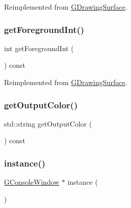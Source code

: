 Reimplemented from \mbox{\hyperlink{classGDrawingSurface_a4fa2d8b0192a3a5b4af4bbfe71194d03}{G\+Drawing\+Surface}}.

\mbox{\label{classGConsoleWindow_a88306467e229356d53f18913d7e167d1}} 
\subsubsection{\texorpdfstring{get\+Foreground\+Int()}{getForegroundInt()}}
{\footnotesize\ttfamily int get\+Foreground\+Int (\begin{DoxyParamCaption}{ }\end{DoxyParamCaption}) const\hspace{0.3cm}{\ttfamily [virtual]}}



Reimplemented from \mbox{\hyperlink{classGDrawingSurface_ac3b12ab385a6ef9ae90fc879860ba726}{G\+Drawing\+Surface}}.

\mbox{\label{classGConsoleWindow_a3da845f74a7bc662249a3d48435c876a}} 
\subsubsection{\texorpdfstring{get\+Output\+Color()}{getOutputColor()}}
{\footnotesize\ttfamily std\+::string get\+Output\+Color (\begin{DoxyParamCaption}{ }\end{DoxyParamCaption}) const\hspace{0.3cm}{\ttfamily [virtual]}}

\mbox{\label{classGConsoleWindow_ae0a74cd46dda62142582f3d8d512f4e5}} 
\subsubsection{\texorpdfstring{instance()}{instance()}}
{\footnotesize\ttfamily \mbox{\hyperlink{classGConsoleWindow}{G\+Console\+Window}} $\ast$ instance (\begin{DoxyParamCaption}{ }\end{DoxyParamCaption})\hspace{0.3cm}{\ttfamily [static]}}

